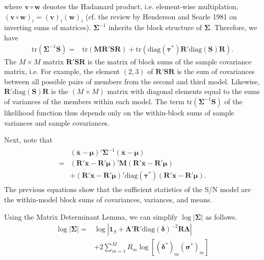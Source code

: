 \documentclass[12pt]{article}
\renewcommand{\vec}[1]{\bm{#1}}
\newcommand{\mat}[1]{\bm{#1}}
\newcommand{\diag}{\text{diag}}
\newcommand{\tr}{\text{tr}}
\begin{document}
%
where $\vec{v} \circ \vec{w}$ denotes the Hadamard product, i.e. element-wise multiplation, $(\vec{v} \circ \vec{w})_i = (\vec{v})_i (\vec{w})_i$ (cf. the review by Henderson and Searle 1981 on inverting sums of matrices).
$\mat{\Sigma}^{-1}$ inherits the block structure of $\mat{\Sigma}$.
Therefore, we have
%
\begin{align}
\tr(\mat{\Sigma}^{-1} \mat{S}) = & \tr(\mat{M}\mat{R}'\mat{S}\mat{R}) + \tr(\diag(\vec{\tau}^*) \mat{R}'\diag(\mat{S})\mat{R}).
\end{align}
%
The $M\times M$ matrix $\mat{R}'\mat{S}\mat{R}$ is the matrix of block sums of the sample covariance matrix, i.e.
For example, the element $(2,3)$ of $\mat{R}'\mat{S}\mat{R}$ is the sum of covariances between all possible pairs of members from the second and third model.
Likewise, $\mat{R}'\diag(\mat{S})\mat{R}$ is the $(M\times M)$ matrix with diagonal elements equal to the sums of variances of the members within each model.
The term $\tr(\mat{\Sigma}^{-1}\mat{S})$ of the likelihood function thus depends only on the within-block sums of sample variances and sample covariances.

Next, note that 
%
\begin{align}
\begin{aligned}
& (\bar{\vec{x}} - \vec{\mu})'\mat{\Sigma}^{-1}(\bar{\vec{x}}-\vec{\mu})\\
 = &(\mat{R}'\bar{\vec{x}} - \mat{R}'\vec{\mu})' \mat{M} (\mat{R}'\bar{\vec{x}} - \mat{R}'\mat{\mu})\\ 
& + (\mat{R}'\bar{\vec{x}}-\mat{R}'\vec{\mu})'\diag(\vec{\tau}^*)(\mat{R}'\bar{\vec{x}}-\mat{R}'\vec{\mu}).
\end{aligned}
\end{align}
%
The previous equations show that the sufficient statistics of the S/N model are the within-model block sums of covariances, variances, and means.


Using the Matrix Determinant Lemma, we can simplify $\log|\mat{\Sigma}|$ as follows.
%
\begin{align}
\log|\mat{\Sigma}| = & \log|\mat{1}_S + \mat{\Lambda}'\mat{R}'\diag(\vec{\delta})^{-2}\mat{R}\mat{\Lambda}|\\
& + 2\sum_{m=1}^M R_m\log[(\vec{\delta}^*)_m(\vec{\sigma}^*)_m]
\end{align}
%
\end{document}
